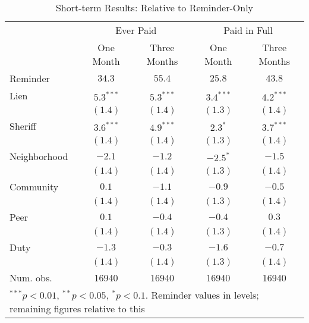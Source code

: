 \begin{table}[htb]
\caption{Short-term Results: Relative to Reminder-Only}
\begin{center}
\begin{tabular}{l c c c c }
\hline
 & \multicolumn{2}{c}{Ever Paid} & \multicolumn{2}{c}{Paid in Full} \\
 & One Month & Three Months & One Month & Three Months \\
Reminder     & $34.3$ & $55.4$ & $25.8$ & $43.8$ \\
\hline
Lien         & $5.3^{***}$  & $5.3^{***}$  & $3.4^{***}$  & $4.2^{***}$  \\
             & $(1.4)$      & $(1.4)$      & $(1.3)$      & $(1.4)$      \\
Sheriff      & $3.6^{***}$  & $4.9^{***}$  & $2.3^{*}$    & $3.7^{***}$  \\
             & $(1.4)$      & $(1.4)$      & $(1.3)$      & $(1.4)$      \\
Neighborhood & $-2.1$       & $-1.2$       & $-2.5^{*}$   & $-1.5$       \\
             & $(1.4)$      & $(1.4)$      & $(1.3)$      & $(1.4)$      \\
Community    & $0.1$        & $-1.1$       & $-0.9$       & $-0.5$       \\
             & $(1.4)$      & $(1.4)$      & $(1.3)$      & $(1.4)$      \\
Peer         & $0.1$        & $-0.4$       & $-0.4$       & $0.3$        \\
             & $(1.4)$      & $(1.4)$      & $(1.3)$      & $(1.4)$      \\
Duty         & $-1.3$       & $-0.3$       & $-1.6$       & $-0.7$       \\
             & $(1.4)$      & $(1.4)$      & $(1.3)$      & $(1.4)$      \\
\hline
Num. obs.    & 16940        & 16940        & 16940        & 16940        \\
\hline
\multicolumn{5}{l}{\scriptsize{$^{***}p<0.01$, $^{**}p<0.05$, $^*p<0.1$. Reminder values in levels; remaining figures relative to this}}
\end{tabular}
\label{sh_lpm_rob}
\end{center}
\end{table}

